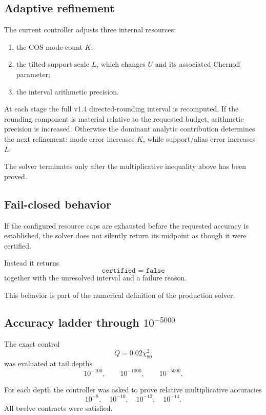 \documentclass[11pt]{article}
\theoremstyle{definition}
\theoremstyle{remark}
\begin{document}
\subsection{Adaptive refinement}

The current controller adjusts three internal resources:

\begin{enumerate}
\item the COS mode count \(K\);
\item the tilted support scale \(L\), which changes \(U\) and its associated
Chernoff parameter;
\item the interval arithmetic precision.
\end{enumerate}

At each stage the full v1.4 directed-rounding interval is recomputed.  If the
rounding component is material relative to the requested budget, arithmetic
precision is increased.  Otherwise the dominant analytic contribution
determines the next refinement: mode error increases \(K\), while
support/alias error increases \(L\).

The solver terminates only after the multiplicative inequality above has been
proved.

\subsection{Fail-closed behavior}

If the configured resource caps are exhausted before the requested accuracy
is established, the solver does not silently return its midpoint as though it
were certified.

Instead it returns
\[
\boxed{\texttt{certified = false}}
\]
together with the unresolved interval and a failure reason.

This behavior is part of the numerical definition of the production solver.

\subsection{Accuracy ladder through \texorpdfstring{\(10^{-5000}\)}{1e-5000}}

The exact control
\[
Q=0.02\chi^2_{80}
\]
was evaluated at tail depths
\[
10^{-100},
\qquad
10^{-1000},
\qquad
10^{-5000}.
\]

For each depth the controller was asked to prove relative multiplicative
accuracies
\[
10^{-8},
\quad
10^{-10},
\quad
10^{-12},
\quad
10^{-14}.
\]
All twelve contracts were satisfied.
\end{document}
